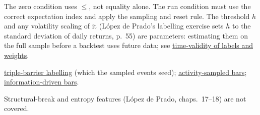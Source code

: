 \begin{qfmethod}
 The zero condition uses $\le$, not equality alone. The run condition must use the correct expectation index and apply the sampling and reset rule. The threshold $h$ and any volatility scaling of it (López de Prado's labelling exercise sets $h$ to the standard deviation of daily returns, p.~55) are parameters: estimating them on the full sample before a backtest uses future data; see \hyperref[pit:label-weight-leakage]{time-validity of labels and weights}.

 \hyperref[meth:triple-barrier-labelling]{triple-barrier labelling} (which the sampled events seed); \hyperref[meth:activity-sampled-bars]{activity-sampled bars}; \hyperref[meth:information-driven-bars]{information-driven bars}.

 Structural-break and entropy features (López de Prado, chaps.~17--18) are not covered.

\end{qfmethod}
